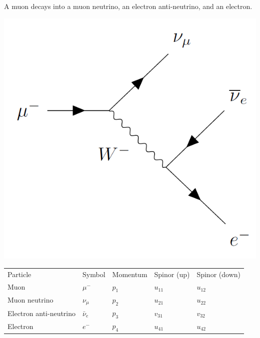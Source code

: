 \documentclass[12pt]{article}
\begin{document}
\noindent
A muon decays into a muon neutrino, an electron anti-neutrino,
and an electron.
\begin{center}
\includegraphics[scale=0.25]{muon-decay-diagram.png}
\end{center}

\begin{center}
\begin{tabular}{lllll}
Particle & Symbol & Momentum & Spinor (up) & Spinor (down)
\\[2ex]
Muon & $\mu^-$ & $p_1$ & $u_{11}$ & $u_{12}$
\\
Muon neutrino & $\nu_\mu$ & $p_2$ & $u_{21}$ & $u_{22}$
\\
Electron anti-neutrino & $\bar{\nu}_e$ & $p_3$ & $v_{31}$ & $v_{32}$
\\
Electron & $e^-$ & $p_4$ & $u_{41}$ & $u_{42}$
\end{tabular}
\end{center}
\end{document}
